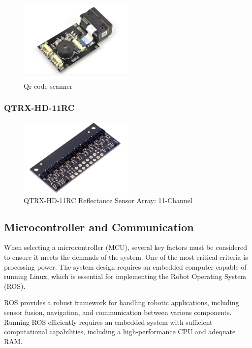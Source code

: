 \documentclass[../../main]{subfiles}
\begin{document}
\begin{figure}[H]
    \centering
    \includegraphics[width=0.5\textwidth]{fig/qr_scanner.png}
    \caption{ Qr code scanner}
    \label{Qr code scanner} %
\end{figure}

\subsubsection{QTRX-HD-11RC}

\begin{figure}[H]
    \centering
    \includegraphics[width=0.5\textwidth]{fig/array.png}
    \caption{ QTRX-HD-11RC Reflectance Sensor Array: 11-Channel }
    \label{QTRX-HD-11RC Ir Array} %
\end{figure}


\subsection{Microcontroller and Communication}

When selecting a microcontroller (MCU), several key factors must be 
considered to ensure it meets the demands of the system. One of the 
most critical criteria is processing power. The system design 
requires an embedded computer capable of running Linux, which is 
essential for implementing the Robot Operating System (ROS). 

ROS provides a robust framework for handling robotic applications, 
including sensor fusion, navigation, and communication between 
various components. Running ROS efficiently requires an embedded 
system with sufficient computational capabilities, including a 
high-performance CPU and adequate RAM.
\end{document}
